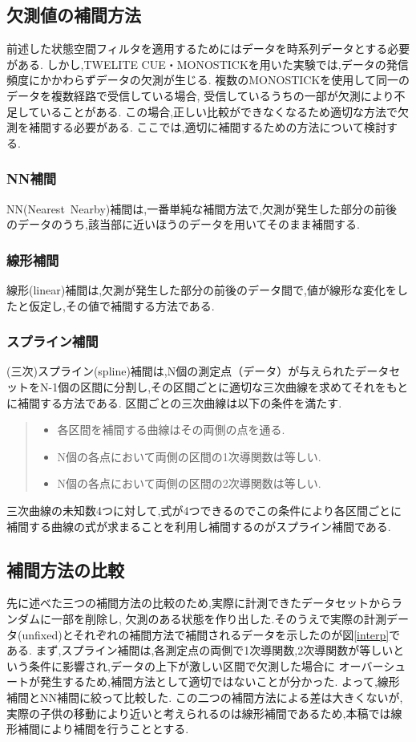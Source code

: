 \subsection{欠測値の補間方法}
前述した状態空間フィルタを適用するためにはデータを時系列データとする必要がある.
しかし,TWELITE CUE・MONOSTICKを用いた実験では,データの発信頻度にかかわらずデータの欠測が生じる.
複数のMONOSTICKを使用して同一のデータを複数経路で受信している場合,
受信しているうちの一部が欠測により不足していることがある.
この場合,正しい比較ができなくなるため適切な方法で欠測を補間する必要がある.
ここでは,適切に補間するための方法について検討する.

\subsubsection{NN補間}
NN(Nearest\ Nearby)補間は,一番単純な補間方法で,欠測が発生した部分の前後
のデータのうち,該当部に近いほうのデータを用いてそのまま補間する.

\subsubsection{線形補間}
線形(linear)補間は,欠測が発生した部分の前後のデータ間で,値が線形な変化をしたと仮定し,その値で補間する方法である.

\subsubsection{スプライン補間}
(三次)スプライン(spline)補間は,N個の測定点（データ）が与えられたデータセットをN-1個の区間に分割し,その区間ごとに適切な三次曲線を求めてそれをもとに補間する方法である.
区間ごとの三次曲線は以下の条件を満たす.
\begin{quote}
  \begin{itemize}
   \item 各区間を補間する曲線はその両側の点を通る.
   \item N個の各点において両側の区間の1次導関数は等しい.
   \item N個の各点において両側の区間の2次導関数は等しい.
  \end{itemize}
\end{quote}
三次曲線の未知数4つに対して,式が4つできるのでこの条件により各区間ごとに補間する曲線の式が求まることを利用し補間するのがスプライン補間である.

\subsection{補間方法の比較}
先に述べた三つの補間方法の比較のため,実際に計測できたデータセットからランダムに一部を削除し,
欠測のある状態を作り出した.そのうえで実際の計測データ(unfixed)とそれぞれの補間方法で補間されるデータを示したのが図\ref{interp}である.
まず,スプライン補間は,各測定点の両側で1次導関数,2次導関数が等しいという条件に影響され,データの上下が激しい区間で欠測した場合に
オーバーシュートが発生するため,補間方法として適切ではないことが分かった.
よって,線形補間とNN補間に絞って比較した.
この二つの補間方法による差は大きくないが,実際の子供の移動により近いと考えられるのは線形補間であるため,本稿では線形補間により補間を行うこととする.

